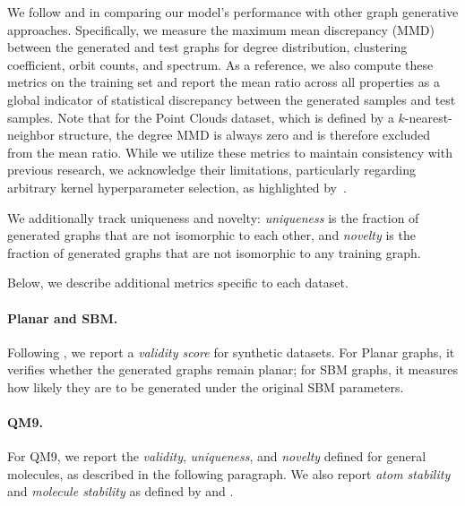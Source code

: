 We follow \citet{martinkus2022spectre} and \citet{vignac2023digress} in comparing our model’s performance with other graph generative approaches. Specifically, we measure the maximum mean discrepancy (MMD) between the generated and test graphs for degree distribution, clustering coefficient, orbit counts, and spectrum. As a reference, we also compute these metrics on the training set and report the mean ratio across all properties as a global indicator of statistical discrepancy between the generated samples and test samples. Note that for the Point Clouds dataset, which is defined by a $k$-nearest-neighbor structure, the degree MMD is always zero and is therefore excluded from the mean ratio. While we utilize these metrics to maintain consistency with previous research, we acknowledge their limitations, particularly regarding arbitrary kernel hyperparameter selection, as highlighted by~\citet{obray2022evaluation,thompson2022evaluation}.

We additionally track uniqueness and novelty: \emph{uniqueness} is the fraction of generated graphs that are not isomorphic to each other, and \emph{novelty} is the fraction of generated graphs that are not isomorphic to any training graph.

Below, we describe additional metrics specific to each dataset.

\paragraph{Planar and SBM.} 
Following \citet{martinkus2022spectre}, we report a \emph{validity score} for synthetic datasets. For Planar graphs, it verifies whether the generated graphs remain planar; for SBM graphs, it measures how likely they are to be generated under the original SBM parameters.

\paragraph{QM9.} 
For QM9, we report the \emph{validity}, \emph{uniqueness}, and \emph{novelty} defined for general molecules, as described in the following paragraph.
We also report \emph{atom stability} and \emph{molecule stability} as defined by \citet{hoogeboom2022equivariant} and \citet{vignac2023digress}.

